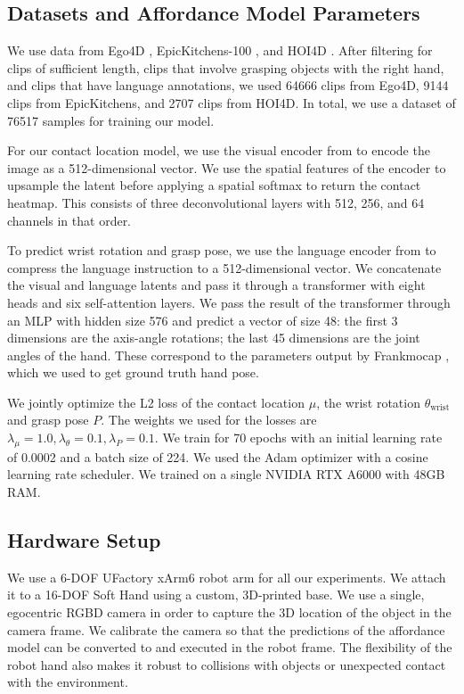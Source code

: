 \subsection{Datasets and Affordance Model Parameters}

We use data from Ego4D \cite{ego4d}, EpicKitchens-100 \cite{EPICKITCHENS}, and HOI4D \cite{hoi4d}.  After filtering for clips of sufficient length, clips that involve grasping objects with the right hand, and clips that have language annotations, we used 64666 clips from Ego4D, 9144 clips from EpicKitchens, and 2707 clips from HOI4D. In total, we use a dataset of 76517 samples for training our model.

For our contact location model, we use the visual encoder from \cite{r3m} to encode the image as a 512-dimensional vector. We use the spatial features of the encoder to upsample the latent before applying a spatial softmax to return the contact heatmap. This consists of three deconvolutional layers with 512, 256, and 64 channels in that order.

To predict wrist rotation and grasp pose, we use the language encoder from \cite{Clip} to compress the language instruction to a 512-dimensional vector. We concatenate the visual and language latents and pass it through a transformer with eight heads and six self-attention layers. We pass the result of the transformer through an MLP with hidden size 576 and predict a vector of size 48: the first 3 dimensions are the axis-angle rotations; the last 45 dimensions are the joint angles of the hand. These correspond to the parameters output by Frankmocap \cite{FrankMocap_2021_ICCV}, which we used to get ground truth hand pose.

We jointly optimize the L2 loss of the contact location $\mu$, the wrist rotation $\theta_\text{wrist}$ and grasp pose $P$. The weights we used for the losses are $\lambda_\mu = 1.0, \lambda_\theta = 0.1, \lambda_P = 0.1$. We train for 70 epochs with an initial learning rate of 0.0002 and a batch size of 224. We used the Adam optimizer \cite{kingma2014adam} with a cosine learning rate scheduler. We trained on a single NVIDIA RTX A6000 with 48GB RAM.

\subsection{Hardware Setup}

We use a 6-DOF UFactory xArm6 robot arm for all our experiments. We attach it to a 16-DOF Soft Hand using a custom, 3D-printed base. We use a single, egocentric RGBD camera in order to capture the 3D location of the object in the camera frame. We calibrate the camera so that the predictions of the affordance model can be converted to and executed in the robot frame. The flexibility of the robot hand also makes it robust to collisions with objects or unexpected contact with the environment. 


